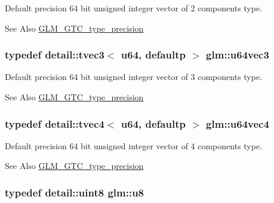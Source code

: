 Default precision 64 bit unsigned integer vector of 2 components type. \begin{DoxySeeAlso}{See Also}
\hyperlink{group__gtc__type__precision}{G\-L\-M\-\_\-\-G\-T\-C\-\_\-type\-\_\-precision} 
\end{DoxySeeAlso}
\hypertarget{group__gtc__type__precision_gae934e74663d832989066cc852560866d}{
\subsubsection[{u64vec3}]{\setlength{\rightskip}{0pt plus 5cm}typedef detail\-::tvec3$<$ u64, defaultp $>$ {\bf glm\-::u64vec3}}}\label{group__gtc__type__precision_gae934e74663d832989066cc852560866d}
Default precision 64 bit unsigned integer vector of 3 components type. \begin{DoxySeeAlso}{See Also}
\hyperlink{group__gtc__type__precision}{G\-L\-M\-\_\-\-G\-T\-C\-\_\-type\-\_\-precision} 
\end{DoxySeeAlso}
\hypertarget{group__gtc__type__precision_ga59d78a1ff6d275bbb425dce92f607b9c}{
\subsubsection[{u64vec4}]{\setlength{\rightskip}{0pt plus 5cm}typedef detail\-::tvec4$<$ u64, defaultp $>$ {\bf glm\-::u64vec4}}}\label{group__gtc__type__precision_ga59d78a1ff6d275bbb425dce92f607b9c}
Default precision 64 bit unsigned integer vector of 4 components type. \begin{DoxySeeAlso}{See Also}
\hyperlink{group__gtc__type__precision}{G\-L\-M\-\_\-\-G\-T\-C\-\_\-type\-\_\-precision} 
\end{DoxySeeAlso}
\hypertarget{group__gtc__type__precision_ga5e3dc67373d5068997d2d9f41c9024d2}{
\subsubsection[{u8}]{\setlength{\rightskip}{0pt plus 5cm}typedef detail\-::uint8 {\bf glm\-::u8}}}\label{group__gtc__type__precision_ga5e3dc67373d5068997d2d9f41c9024d2}
